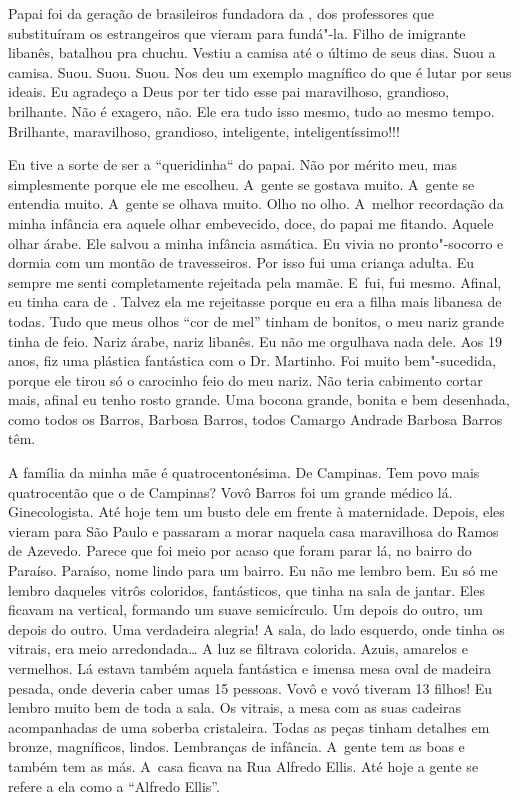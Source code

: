Papai foi da geração de brasileiros fundadora da , dos professores
que substituíram os estrangeiros que vieram para fundá"-la. Filho de
imigrante libanês, batalhou pra chuchu. Vestiu a camisa até o último de
seus dias. Suou a camisa. Suou. Suou. Suou. Nos deu um exemplo magnífico
do que é lutar por seus ideais. Eu agradeço a Deus por ter tido esse pai
maravilhoso, grandioso, brilhante. Não é exagero, não. Ele era tudo isso
mesmo, tudo ao mesmo tempo. Brilhante, maravilhoso, grandioso,
inteligente, inteligentíssimo!!!

Eu tive a sorte de ser a ``queridinha`` do papai. Não por mérito meu,
mas simplesmente porque ele me escolheu. A~gente se gostava muito. A~gente se entendia muito. A~gente se olhava muito. Olho no olho. A~melhor
recordação da minha infância era aquele olhar embevecido, doce, do papai
me fitando. Aquele olhar árabe. Ele salvou a minha infância asmática. Eu
vivia no pronto"-socorro e dormia com um montão de travesseiros. Por isso
fui uma criança adulta. Eu sempre me senti completamente rejeitada pela
mamãe. E~fui, fui mesmo. Afinal, eu tinha cara de . Talvez ela me
rejeitasse porque eu era a filha mais libanesa de todas. Tudo que meus
olhos ``cor de mel'' tinham de bonitos, o meu nariz grande tinha de
feio. Nariz árabe, nariz libanês. Eu não me orgulhava nada dele. Aos 19
anos, fiz uma plástica fantástica com o Dr. Martinho. Foi muito
bem"-sucedida, porque ele tirou só o carocinho feio do meu nariz. Não
teria cabimento cortar mais, afinal eu tenho rosto grande. Uma bocona
grande, bonita e bem desenhada, como todos os Barros, Barbosa Barros,
todos Camargo Andrade Barbosa Barros têm.

A família da minha mãe é quatrocentonésima. De Campinas. Tem povo mais
quatrocentão que o de Campinas? Vovô Barros foi um grande médico lá.
Ginecologista. Até hoje tem um busto dele em frente à maternidade.
Depois, eles vieram para São Paulo e passaram a morar naquela casa
maravilhosa do Ramos de Azevedo. Parece que foi meio por acaso que foram
parar lá, no bairro do Paraíso. Paraíso, nome lindo para um bairro. Eu
não me lembro bem. Eu só me lembro daqueles vitrôs coloridos,
fantásticos, que tinha na sala de jantar. Eles ficavam na vertical,
formando um suave semicírculo. Um depois do outro, um depois do outro.
Uma verdadeira alegria! A sala, do lado esquerdo, onde tinha os vitrais,
era meio arredondada… A luz se filtrava colorida. Azuis, amarelos
e vermelhos. Lá estava também aquela fantástica e imensa mesa oval de
madeira pesada, onde deveria caber umas 15 pessoas. Vovô e vovó tiveram
13 filhos! Eu lembro muito bem de toda a sala. Os vitrais, a mesa com as
suas cadeiras acompanhadas de uma soberba cristaleira. Todas as peças
tinham detalhes em bronze, magníficos, lindos. Lembranças de infância. A~gente tem as boas e também tem as más. A~casa ficava na Rua Alfredo
Ellis. Até hoje a gente se refere a ela como a ``Alfredo Ellis''.

